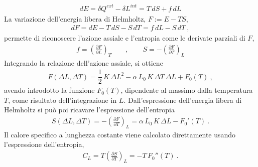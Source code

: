 \documentclass[letterpaper,10pt,italian]{jupyterBook}
\begin{document}
\sphinxAtStartPar
{}
\begin{equation*}
\begin{split}d E = \delta Q^{ext} - \delta L^{int} = T \, dS + f \, dL\end{split}
\end{equation*}
\sphinxAtStartPar
La variazione dell’energia libera di Helmholtz, \(F := E - TS\),
\begin{equation*}
\begin{split}dF = d E - T \, dS - S \, dT = f \, dL - S \, dT \ ,\end{split}
\end{equation*}
\sphinxAtStartPar
permette di riconoscere l’azione assiale e l’entropia come le derivate parziali di \(F\),
\begin{equation*}
\begin{split}
f = \left(\frac{\partial F}{\partial L} \right)_T
\qquad , \qquad
S = - \left(\frac{\partial F}{\partial T} \right)_L
\end{split}
\end{equation*}
\sphinxAtStartPar
Integrando la relazione dell’azione assiale, si ottiene
\begin{equation*}
\begin{split}F(\Delta L, \Delta T) = \dfrac{1}{2} \, K \, \Delta L^2 - \alpha \, L_0 \, K \, \Delta T \, \Delta L + F_0(T) \ ,\end{split}
\end{equation*}
\sphinxAtStartPar
avendo introdotto la funzione \(F_0(T)\), dipendente al massimo dalla temperatura \(T\), come risultato dell’integrazione in \(L\).
Dall’espressione dell’energia libera di Helmholtz si può poi ricavare l’espressione dell’entropia
\begin{equation*}
\begin{split}
S(\Delta L, \Delta T) = - \left(\frac{\partial F}{\partial T} \right)_L = \alpha \, L_0 \, K \, \Delta L - F_0'(T) \ .
\end{split}
\end{equation*}
\sphinxAtStartPar
{}
Il calore specifico a lunghezza costante viene calcolato direttamente usando l’espressione dell’entropia,
\begin{equation*}
\begin{split}C_L = T \left(\frac{\partial S}{\partial T} \right)_L = - T \, F_0''(T) \ .\end{split}
\end{equation*}
\sphinxAtStartPar
\end{document}
